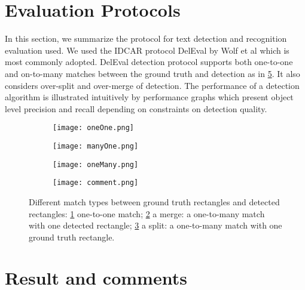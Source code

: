 \section{Evaluation Protocols}
In this section, we summarize the protocol for text detection and recognition evaluation used. We used the IDCAR protocol DelEval by Wolf et al \cite{WolfIJDAR2006} which is most commonly adopted. DelEval detection protocol supports both one-to-one and on-to-many matches between the ground truth and detection as in \ref{fig:GroundTruthMatch}. It also considers over-split and over-merge of detection. The performance of a detection algorithm is illustrated intuitively by performance graphs which present object level precision and recall depending on constraints on detection quality.
\begin{figure}
\begin{center}


	\begin{subfigure}[b]{\textwidth}
	 	\texttt{[image: oneOne.png]} \centering \caption{}\label{fig:oneOne} \end{subfigure}
		
	\begin{subfigure}[b]{\textwidth}
		\texttt{[image: manyOne.png]} \centering	 \caption{}\label{fig:manyOne} \end{subfigure}		 	
	 	
	\begin{subfigure}[b]{\textwidth}
		\texttt{[image: oneMany.png]} \centering	 \caption{}\label{fig:oneMany} \end{subfigure}	


	
	\begin{subfigure}[b]{\textwidth}
		\texttt{[image: comment.png]} \centering	 \caption{}\label{fig:comment} \end{subfigure}
\end{center}
	\caption[Example of ground truth match types] {Different match types between ground truth rectangles and detected rectangles: \ref{fig:oneOne} one-to-one match; \ref{fig:manyOne} a merge: a one-to-many match with one detected rectangle; \ref{fig:oneMany} a split: a one-to-many match with one ground truth rectangle.}
	\label{fig:GroundTruthMatch}
\end{figure}

\section{Result and comments}
